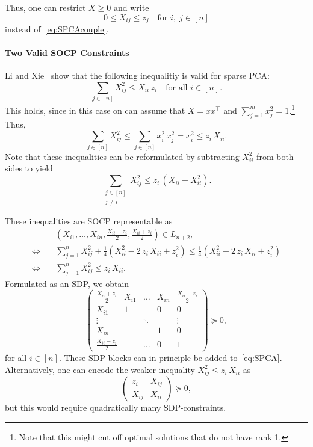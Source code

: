 \documentclass[10pt, a4paper]{article}
\newcommand{\T}{^{\top}}
\begin{document}
Thus, one can restrict $X \geq 0$ and write
\[
  0 \leq X_{ij} \leq z_j \quad \text{for } i,\; j \in [n]
\]
instead of~\eqref{eq:SPCAcouple}.

\paragraph{Two Valid SOCP Constraints}

Li and Xie~\cite{LiX20} show that the following inequalitiy is valid for
sparse PCA:
\[
  \sum_{j \in [n]} X_{ij}^2 \leq X_{ii}\, z_i \quad\text{for all } i \in [n].
\]
This holds, since in this case on can assume that $X = x x\T$ and $\sum_{j=1}^m x_j^2 =
1$.\footnote{Note that this might cut off optimal solutions that do not
  have rank 1.} Thus,
\[
  \sum_{j \in [n]} X_{ij}^2 \leq \sum_{j \in [n]} x_i^2\, x_j^2 = x_i^2
  \leq z_i\, X_{ii}.
\]
Note that these inequalities can be reformulated by subtracting $X_{ii}^2$
from both sides to yield
\[
  \sum_{\substack{j \in [n]\\ j \neq i}} X_{ij}^2 \leq z_i\, (X_{ii} - X_{ii}^2).
\]


These inequalities are SOCP representable as
\begin{align*}
  & (X_{i1}, \dots, X_{in}, \tfrac{X_{ii} - z_i}{2}, \tfrac{X_{ii} + z_i}{2}) \in L_{n+2},\\
  \Leftrightarrow\quad & \sum_{j=1}^n X_{ij}^2 + \tfrac{1}{4}(X_{ii}^2 - 2\,
                    z_i\, X_{ii} + z_i^2) \leq \tfrac{1}{4}(X_{ii}^2 + 2\, z_i\, X_{ii} + z_i^2)\\
  \Leftrightarrow\quad & \sum_{j=1}^n X_{ij}^2 \leq z_i\, X_{ii}.
\end{align*}
Formulated as an SDP, we obtain
\[
  \begin{pmatrix}
    \tfrac{X_{ii} + z_i}{2} & X_{i1} & \dots & X_{in} & \tfrac{X_{ii} - z_i}{2}\\
    X_{i1} & 1 &  & 0 & 0\\
    \vdots & & \ddots & & \vdots\\
    X_{in} & &    & 1 & 0\\
    \tfrac{X_{ii} - z_i}{2} & & \dots & 0 & 1
  \end{pmatrix}
  \succeq 0,
\]
for all $i \in [n]$.  These SDP blocks can in principle be added
to~\eqref{eq:SPCA}. Alternatively, one can encode the weaker inequality
$X_{ij}^2 \leq z_i\, X_{ii}$ as
\[
  \begin{pmatrix}
    z_i & X_{ij}\\
    X_{ij} & X_{ii}
  \end{pmatrix}
  \succeq 0,
\]
but this would require quadratically many SDP-constraints.
\end{document}
